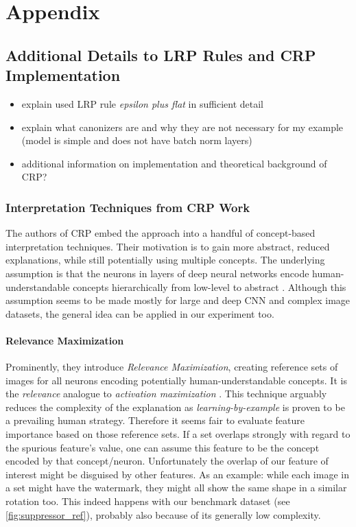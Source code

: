 \chapter{Appendix}\label{chapter:Appendix}

\section{Additional Details to LRP Rules and CRP Implementation}
\label{appendix:lrprules}
\begin{itemize}
    \item explain used LRP rule \textit{epsilon plus flat} in sufficient detail
    \item explain what canonizers are and why they are not necessary for my example (model is simple and does not have batch norm layers) 
    \item additional information on implementation and theoretical background of CRP?
    
\end{itemize}
\subsection{Interpretation Techniques from CRP Work}
The authors of CRP embed the approach into a handful of concept-based interpretation techniques. Their motivation is to gain more abstract, reduced explanations, while still potentially using multiple concepts. The underlying assumption is that the neurons in layers of deep neural networks encode human-understandable concepts hierarchically from low-level to abstract \cite{Zeiler2013,Bau2017,Olah2017}. Although this assumption seems to be made mostly for large and deep CNN and complex image datasets, the general idea can be applied in our experiment too. 

\subsubsection{Relevance Maximization}
Prominently, they introduce \textit{Relevance Maximization}, creating reference sets of images for all neurons encoding potentially human-understandable concepts. It is the \textit{relevance} analogue to \textit{activation maximization} \cite{Nguyen2016}. This technique arguably reduces the complexity of the explanation as \textit{learning-by-example} is proven to be a prevailing human strategy.
Therefore it seems fair to evaluate feature importance based on those reference sets. If a set overlaps strongly with regard to the spurious feature's value, one can assume this feature to be the concept encoded by that concept/neuron. 
Unfortunately the overlap of our feature of interest might be disguised by other features. As an example: while each image in a set might have the watermark, they might all show the same shape in a similar rotation too. This indeed happens with our benchmark dataset (see \cref{fig:suppressor_ref}), probably also because of its generally low complexity. 

